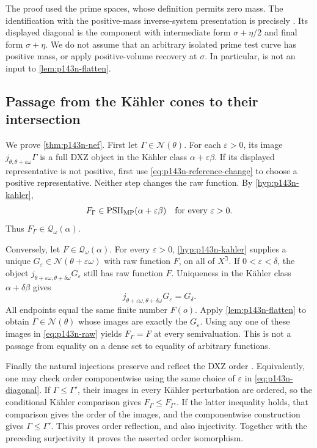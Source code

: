 The proof used the prime spaces, whose definition permits zero mass.
The identification with the positive-mass inverse-system presentation
is precisely \cite[Lemma~3.7]{XiaOps}. Its displayed diagonal is the
component with intermediate form \(\sigma+\eta/2\) and final form
\(\sigma+\eta\). We do not assume that an arbitrary isolated prime
test curve has positive mass, or apply positive-volume recovery at
\(\sigma\). In particular, \cite[Lemma~3.10]{XiaOps} is not an
input to \cref{lem:p143n-flatten}.

\subsection{Passage from the K\"ahler cones to their intersection}

We prove \cref{thm:p143n-nef}. First let
\(\Gamma\in\mathcal N(\theta)\). For each \(\varepsilon>0\), its
image \(j_{\theta,\theta+\varepsilon\omega}\Gamma\) is a full
DXZ object in the K\"ahler class \(\alpha+\varepsilon\beta\).
If its displayed representative is not positive, first use
\eqref{eq:p143n-reference-change} to choose a positive representative.
Neither step changes the raw function. By
\cref{hyp:p143n-kahler},
\[
 F_\Gamma\in\operatorname{PSH}_{\mathrm{MP}}(\alpha+\varepsilon\beta)
 \quad\hbox{for every }\varepsilon>0.
\]
Thus \(F_\Gamma\in\mathcal Q_\omega(\alpha)\).

Conversely, let \(F\in\mathcal Q_\omega(\alpha)\). For every
\(\varepsilon>0\), \cref{hyp:p143n-kahler} supplies a unique
\(G_\varepsilon\in\mathcal N(\theta+\varepsilon\omega)\)
with raw function \(F\), on all of \(X^\beth\). If
\(0<\varepsilon<\delta\), the object
\(j_{\theta+\varepsilon\omega,\theta+\delta\omega}
G_\varepsilon\) still has raw function \(F\). Uniqueness in the
K\"ahler class \(\alpha+\delta\beta\) gives
\begin{equation}\label{eq:p143n-coherence}
 j_{\theta+\varepsilon\omega,\theta+\delta\omega}
 G_\varepsilon=G_\delta.
\end{equation}
All endpoints equal the same finite number \(F(o)\). Apply
\cref{lem:p143n-flatten} to obtain \(\Gamma\in\mathcal N(\theta)\)
whose images are exactly the \(G_\varepsilon\). Using any one of
these images in \eqref{eq:p143n-raw} yields \(F_\Gamma=F\)
at every semivaluation. This is not a passage from equality on a dense
set to equality of arbitrary functions.

Finally the natural injections preserve and reflect the DXZ order
\cite[Definition~4.1 and Lemma~4.2]{XiaOps}. Equivalently, one may
check order componentwise using the same choice of \(\varepsilon\)
in \eqref{eq:p143n-diagonal}. If \(\Gamma\leq\Gamma'\), their
images in every K\"ahler perturbation are ordered, so the conditional
K\"ahler comparison gives \(F_\Gamma\leq F_{\Gamma'}\).
If the latter inequality holds, that comparison gives the order of
the images, and the componentwise construction gives
\(\Gamma\leq\Gamma'\). This proves order reflection, and also
injectivity. Together with the preceding surjectivity it proves the
asserted order isomorphism.

